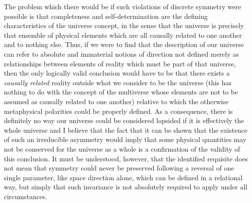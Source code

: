 \documentclass[notitlepage,12pt]{report}
\begin{document}
The problem which there would be if such violations of discrete symmetry were possible is that completeness and self-determination are the defining characteristics of the universe concept, in the sense that the universe is precisely that ensemble of physical elements which are all causally related to one another and to nothing else. Thus, if we were to find that the description of our universe can refer to absolute and immaterial notions of direction not defined merely as relationships between elements of reality which must be part of that universe, then the only logically valid conclusion would have to be that there exists a \textit{causally related} reality outside what we consider to be the universe (this has nothing to do with the concept of the multiverse whose elements are not to be assumed as causally related to one another) relative to which the otherwise metaphysical polarities could be properly defined. As a consequence, there is definitely no way our universe could be considered lopsided if it is effectively the whole universe and I believe that the fact that it can be shown that the existence of such an irreducible asymmetry would imply that some physical quantities may not be conserved for the universe as a whole is a confirmation of the validity of this conclusion. It must be understood, however, that the identified requisite does not mean that symmetry could never be preserved following a reversal of one single parameter, like space direction alone, which can be defined in a relational way, but simply that such invariance is not absolutely required to apply under all circumstances.
\end{document}
